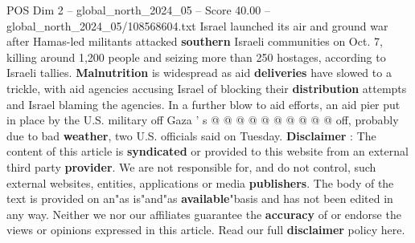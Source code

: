 \begin{textsample}{POS Dim 2 – global\_north\_2024\_05 – Score 40.00 – global\_north\_2024\_05/108568604.txt}
Israel launched its air and ground war after Hamas-led militants attacked \textbf{southern} Israeli communities on Oct. 7, killing around 1,200 people and seizing more than 250 hostages, according to Israeli tallies. \textbf{Malnutrition} is widespread as aid \textbf{deliveries} have slowed to a trickle, with aid agencies accusing Israel of blocking their \textbf{distribution} attempts and Israel blaming the agencies.
In a further blow to aid efforts, an aid pier put in place by the U.S. military off Gaza ' s @ @ @ @ @ @ @ @ @ @ off, probably due to bad \textbf{weather}, two U.S. officials said on Tuesday. \textbf{Disclaimer} : The content of this article is \textbf{syndicated} or provided to this website from an external third party \textbf{provider}.
We are not responsible for, and do not control, such external websites, entities, applications or media \textbf{publishers}.
The body of the text is provided on an"as is"and"as \textbf{available}"basis and has not been edited in any way.
Neither we nor our affiliates guarantee the \textbf{accuracy} of or endorse the views or opinions expressed in this article.
Read our full \textbf{disclaimer} policy here.

\end{textsample}
